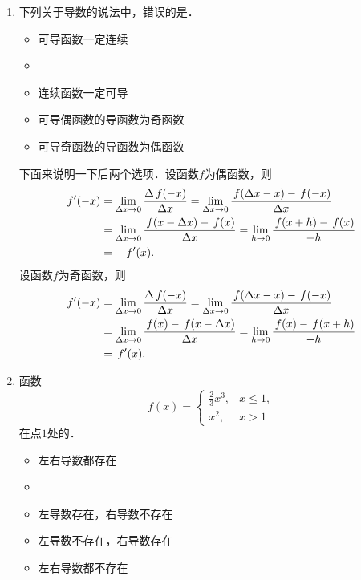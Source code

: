 \begin{enumerate}
\item 下列关于导数的说法中，错误的是\uline{\hspace{10em}}．
  \begin{itemize}
    \renewcommand{\labelitemi}{\faCircleThin}
  \item 可导函数一定连续
    \ifshowsol
    \item[\faCircle]
    \else
    \item
    \fi
    连续函数一定可导
  \item 可导偶函数的导函数为奇函数
  \item 可导奇函数的导函数为偶函数
  \end{itemize}

  \ifshowsol
    下面来说明一下后两个选项．设函数\(f\)为偶函数，则
    \begin{equation*}
      \begin{split}
        f'(-x)
        &= \lim_{\fdx \to 0} \frac{\fwdf\,f(-x)}{\fdx}
          = \lim_{\fdx \to 0} \frac{\,f(\fdx-x) - \,f(-x)}{\fdx} \\
        &= \lim_{\fdx \to 0} \frac{\,f(x-\fdx) - \,f(x)}{\fdx}
          = \lim_{h \to 0} \frac{\,f(x+h) - \,f(x)}{-h} \\
        &= - \,f'(x).
      \end{split}
    \end{equation*}
    设函数\(f\)为奇函数，则
    \begin{equation*}
      \begin{split}
        f'(-x)
        &= \lim_{\fdx \to 0} \frac{\fwdf\,f(-x)}{\fdx}
          = \lim_{\fdx \to 0} \frac{\,f(\fdx-x) - \,f(-x)}{\fdx} \\
        &= \lim_{\fdx \to 0} \frac{\,f(x) - \,f(x-\fdx)}{\fdx}
          = \lim_{h \to 0} \frac{\,f(x) - \,f(x+h)}{-h} \\
        &= \,f'(x).
      \end{split}
    \end{equation*}
  \fi

\item 函数
  \begin{equation*}
    f(x) =
    \begin{cases}
      \frac23 x^3, & x \le 1, \\
      x^2, & x > 1
    \end{cases}
  \end{equation*}
  在点\(1\)处的\uline{\hspace{10em}}．
  \begin{itemize}
    \renewcommand{\labelitemi}{\faCircleThin}
  \item 左右导数都存在
    \ifshowsol
    \item[\faCircle]
    \else
    \item
    \fi
    左导数存在，右导数不存在
  \item 左导数不存在，右导数存在
  \item 左右导数都不存在
  \end{itemize}


\end{enumerate}
